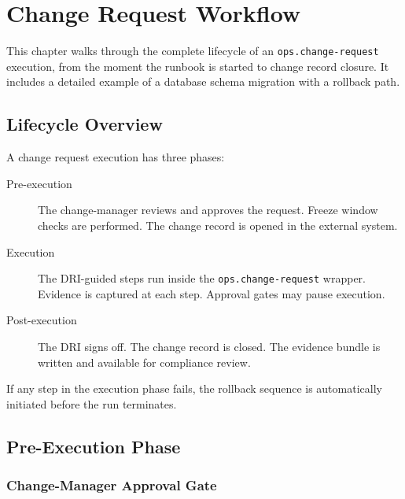 \chapter{Change Request Workflow}
\label{ch:change-request-workflow}

This chapter walks through the complete lifecycle of an \texttt{ops.change-request} execution,
from the moment the runbook is started to change record closure. It includes a detailed example
of a database schema migration with a rollback path.

\section{Lifecycle Overview}
\label{sec:cr-lifecycle}

A change request execution has three phases:

\begin{description}
  \item[Pre-execution] The change-manager reviews and approves the request. Freeze window
    checks are performed. The change record is opened in the external system.
  \item[Execution] The DRI-guided steps run inside the \texttt{ops.change-request} wrapper.
    Evidence is captured at each step. Approval gates may pause execution.
  \item[Post-execution] The DRI signs off. The change record is closed. The evidence bundle
    is written and available for compliance review.
\end{description}

If any step in the execution phase fails, the rollback sequence is automatically initiated
before the run terminates.

\section{Pre-Execution Phase}
\label{sec:cr-pre-execution}

\subsection{Change-Manager Approval Gate}

